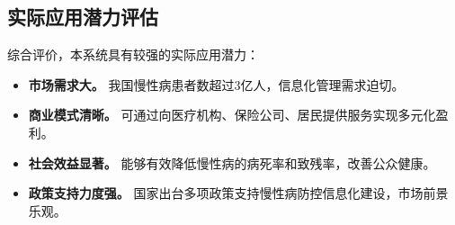 \subsection{实际应用潜力评估}

综合评价，本系统具有较强的实际应用潜力：

\begin{itemize}[itemindent=2em]
\item \textbf{市场需求大。} 我国慢性病患者数超过3亿人，信息化管理需求迫切。

\item \textbf{商业模式清晰。} 可通过向医疗机构、保险公司、居民提供服务实现多元化盈利。

\item \textbf{社会效益显著。} 能够有效降低慢性病的病死率和致残率，改善公众健康。

\item \textbf{政策支持力度强。} 国家出台多项政策支持慢性病防控信息化建设，市场前景乐观。

\end{itemize}
